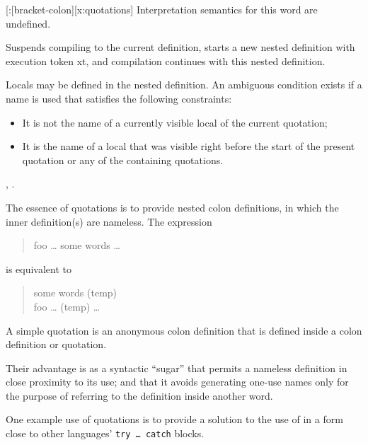\begin{worddef}{}{[:}[bracket-colon][x:quotations]
\interpret
	Interpretation semantics for this word are undefined.

\compile

	Suspends compiling to the current definition, starts a new nested
	definition with execution token xt, and compilation continues with
	this nested definition.

	Locals may be defined in the nested definition.  An ambiguous
	condition exists if a name is used that satisfies the following
	constraints:
	\begin{itemize}
	\item It is not the name of a currently visible local of the current
		quotation;
	\item It is the name of a local that was visible right before the start
		of the present quotation or any of the containing quotations.
	\end{itemize} 

\see \wref{tools:;]}{}, \rref{tools:[:}{}. %

	\begin{rationale}
		The essence of quotations is to provide nested colon definitions,
		in which the inner definition(s) are nameless. The expression
		\begin{quote}\ttfamily
			\word{:} foo {\ldots} \word{[:} some words \word{;]} {\ldots} \word{;}
		\end{quote}
		is equivalent to
		\begin{quote}\ttfamily
			 some words \word{;}  (temp) \\
			\word{:} foo {\ldots} (temp) {\ldots} \word{;}
		\end{quote}

		A simple quotation is an anonymous colon definition that is defined
		inside a colon definition or quotation.

		Their advantage is as a syntactic ``sugar'' that permits a nameless
		definition in close proximity to its use; and that it avoids generating
		one-use names only for the purpose of referring to the definition
		inside another word.

		One example use of quotations is to provide a solution to the use
		of  in a form close to other languages'
		\texttt{try {\ldots} catch} blocks.


\end{rationale}
\end{worddef}
